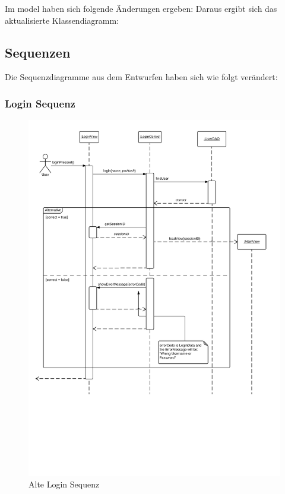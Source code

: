 Im model haben sich folgende Änderungen ergeben: %
Daraus ergibt sich das aktualisierte Klassendiagramm:


\subsection{Sequenzen}
Die Sequenzdiagramme aus dem Entwurfen haben sich wie folgt verändert:
\subsubsection{Login Sequenz}

\begin{figure}
  \centering
    \includegraphics[width=\linewidth]{Login-Sequenz.svg}
   \caption{Alte Login Sequenz}
\end{figure}

